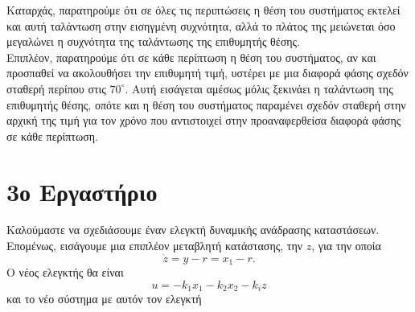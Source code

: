 \documentclass[12pt]{article}
\begin{document}
Καταρχάς, παρατηρούμε ότι σε όλες τις περιπτώσεις η θέση του συστήματος εκτελεί και αυτή ταλάντωση στην εισηγμένη συχνότητα, αλλά το πλάτος της μειώνεται όσο μεγαλώνει η συχνότητα της ταλάντωσης της επιθυμητής θέσης. \\
Επιπλέον, παρατηρούμε ότι σε κάθε περίπτωση η θέση του συστήματος, αν και προσπαθεί να ακολουθήσει την επιθυμητή τιμή, υστέρει με μια διαφορά φάσης σχεδόν σταθερή περίπου στις \(70^\circ\). Αυτή εισάγεται αμέσως μόλις ξεκινάει η ταλάντωση της επιθυμητής θέσης, οπότε και η θέση του συστήματος παραμένει σχεδόν σταθερή στην αρχική της τιμή για τον χρόνο που αντιστοιχεί στην προαναφερθείσα διαφορά φάσης σε κάθε περίπτωση. 
\section*{3ο Εργαστήριο}
Καλούμαστε να σχεδιάσουμε έναν ελεγκτή δυναμικής ανάδρασης καταστάσεων. Επομένως, εισάγουμε μια επιπλέον μεταβλητή κατάστασης, την \(z\), για την οποία
\begin{equation*}
    \dot{z} = y - r = x_1 - r.
\end{equation*} 
Ο νέος ελεγκτής θα είναι 
\begin{equation*}
    u = -k_1 x_1 - k_2 x_2 - k_i z
\end{equation*} και το νέο σύστημα με αυτόν τον ελεγκτή
\end{document}
